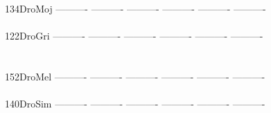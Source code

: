 \documentclass[11pt,twoside,reqno,a4paper]{article}
\begin{document}
{134\hspace*{2\charwidth}DroMoj	----------	----------	----------	----------	----------	----------	\\
\hspace*{5\charwidth}\hspace*{7\charwidth}\hspace*{1\charwidth}\hspace*{1\charwidth}\hspace*{1\charwidth}\hspace*{1\charwidth}\hspace*{1\charwidth}\hspace*{1\charwidth}\\
122\hspace*{2\charwidth}DroGri	----------	----------	----------	----------	----------	----------	\\
\hspace*{5\charwidth}\hspace*{7\charwidth}\hspace*{1\charwidth}\hspace*{1\charwidth}\hspace*{1\charwidth}\hspace*{1\charwidth}\hspace*{1\charwidth}\hspace*{1\charwidth}\\
\\
152\hspace*{2\charwidth}DroMel	----------	----------	----------	----------	----------	----------	\\
\hspace*{5\charwidth}\hspace*{7\charwidth}\hspace*{1\charwidth}\hspace*{1\charwidth}\hspace*{1\charwidth}\hspace*{1\charwidth}\hspace*{1\charwidth}\hspace*{1\charwidth}\\
140\hspace*{2\charwidth}DroSim	----------	----------	----------	----------	----------	----------	\\
\hspace*{5\charwidth}\hspace*{7\charwidth}\hspace*{1\charwidth}\hspace*{1\charwidth}\hspace*{1\charwidth}\hspace*{1\charwidth}\hspace*{1\charwidth}\hspace*{1\charwidth}\\
}
\end{document}
